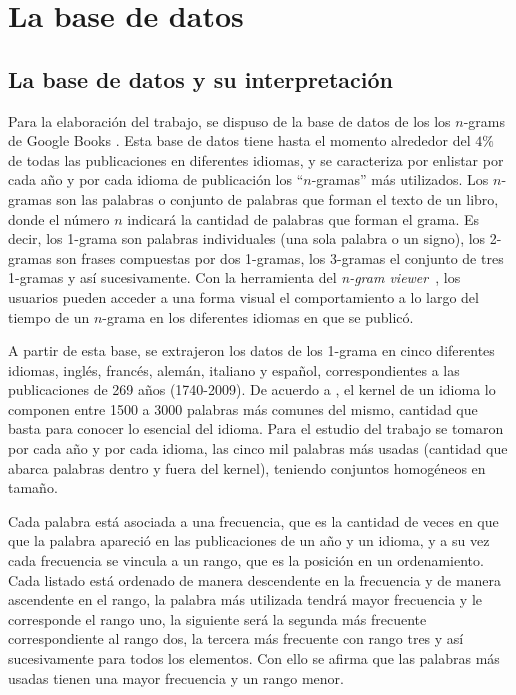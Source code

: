 \chapter{La base de datos}
\section{La base de datos y su interpretación} %
Para la elaboración del trabajo,  se dispuso de la base de datos de los los
$n$-grams de Google Books  \cite{ngramv}. Esta base de datos
tiene hasta el momento alrededor del $4\%$ de todas las publicaciones en
diferentes idiomas,  y se caracteriza por enlistar  por cada año y por cada
idioma de publicación los ``$n$-gramas'' más utilizados.   Los $n$-gramas son
las palabras o conjunto de palabras que forman el texto de un libro, donde el
número $n$ indicará la cantidad de palabras que forman el grama.  Es decir, los
1-grama son palabras individuales (una sola palabra o un signo), los 2-gramas
son frases compuestas por dos 1-gramas, los 3-gramas el conjunto de tres 1-gramas
y así sucesivamente.   Con la herramienta del \textit{n-gram
viewer}~\cite{ngramv}, los usuarios pueden acceder a una forma visual el
comportamiento a lo largo del tiempo de un $n$-grama en los diferentes idiomas
en que se publicó.  

A partir de esta base, se extrajeron los datos de los 1-grama en cinco
diferentes idiomas, inglés, francés, alemán, italiano y español,
correspondientes a las publicaciones de 269 años (1740-2009).  De acuerdo a
\cite{languagesascool},  el kernel de un idioma lo componen entre 1500 a 3000
palabras más comunes del mismo,  cantidad que basta para conocer lo esencial
del idioma. Para el
estudio del trabajo se tomaron por cada año y por cada idioma,  las cinco mil
palabras más usadas (cantidad que abarca palabras dentro y fuera del kernel),
teniendo conjuntos homogéneos en tamaño.

Cada palabra está asociada a una frecuencia, que es la cantidad de veces en que
que la  palabra apareció en las publicaciones de un año y un idioma, y a su vez
cada frecuencia se vincula a un rango, que es la posición en un ordenamiento.
Cada listado está ordenado de manera descendente en la frecuencia y de manera
ascendente en el rango, la palabra más utilizada tendrá mayor frecuencia y le
corresponde el rango uno,  la siguiente será la segunda más frecuente
correspondiente al rango dos,  la tercera más frecuente con rango tres y así
sucesivamente para todos los elementos.  Con ello se afirma que las palabras
más usadas tienen una mayor frecuencia y un rango menor. 

